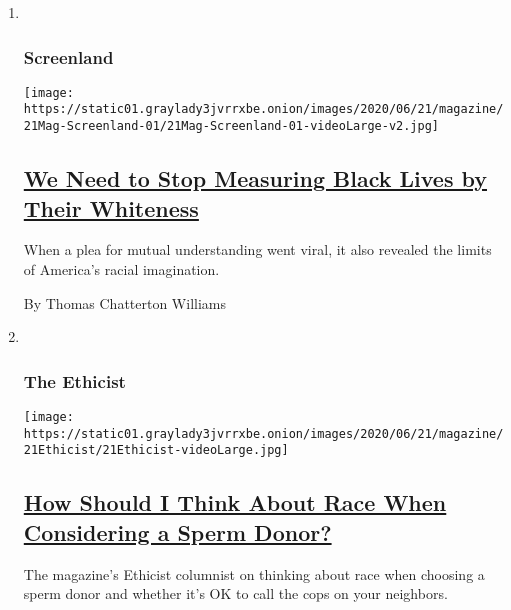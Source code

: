 \begin{enumerate}
\def\labelenumi{\arabic{enumi}.}
\item ~
  \hypertarget{screenland}{%
  \subsubsection{Screenland}\label{screenland}}

  \texttt{[image: https://static01.graylady3jvrrxbe.onion/images/2020/06/21/magazine/21Mag-Screenland-01/21Mag-Screenland-01-videoLarge-v2.jpg]}

  \hypertarget{we-need-to-stop-measuring-black-lives-by-their-whiteness}{%
  \subsection{\texorpdfstring{\href{/2020/06/18/magazine/before-you-call-the-cops-video-tyler-merritt.html}{We
  Need to Stop Measuring Black Lives by Their
  Whiteness}}{We Need to Stop Measuring Black Lives by Their Whiteness}}\label{we-need-to-stop-measuring-black-lives-by-their-whiteness}}

  When a plea for mutual understanding went viral, it also revealed the
  limits of America's racial imagination.

  By Thomas Chatterton Williams
\item ~
  \hypertarget{the-ethicist}{%
  \subsubsection{The Ethicist}\label{the-ethicist}}

  \texttt{[image: https://static01.graylady3jvrrxbe.onion/images/2020/06/21/magazine/21Ethicist/21Ethicist-videoLarge.jpg]}

  \hypertarget{how-should-i-think-about-race-when-considering-a-sperm-donor}{%
  \subsection{\texorpdfstring{\href{/2020/06/16/magazine/how-should-i-think-about-race-when-considering-a-sperm-donor.html}{How
  Should I Think About Race When Considering a Sperm
  Donor?}}{How Should I Think About Race When Considering a Sperm Donor?}}\label{how-should-i-think-about-race-when-considering-a-sperm-donor}}

  The magazine's Ethicist columnist on thinking about race when choosing
  a sperm donor and whether it's OK to call the cops on your neighbors.


\end{enumerate}
